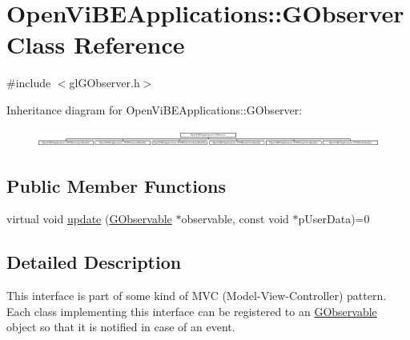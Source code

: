 \hypertarget{classOpenViBEApplications_1_1GObserver}{
\section{OpenViBEApplications::GObserver Class Reference}
\label{classOpenViBEApplications_1_1GObserver}
}


{\ttfamily \#include $<$glGObserver.h$>$}

Inheritance diagram for OpenViBEApplications::GObserver:\begin{figure}[H]
\begin{center}
\leavevmode
\includegraphics[height=0.587002cm]{classOpenViBEApplications_1_1GObserver}
\end{center}
\end{figure}
\subsection*{Public Member Functions}
\begin{DoxyCompactItemize}
\item 
virtual void \hyperlink{classOpenViBEApplications_1_1GObserver_a798ae875586bc6cf2c636272a97522f5}{update} (\hyperlink{classOpenViBEApplications_1_1GObservable}{GObservable} $\ast$observable, const void $\ast$pUserData)=0
\end{DoxyCompactItemize}


\subsection{Detailed Description}
This interface is part of some kind of MVC (Model-\/View-\/Controller) pattern. Each class implementing this interface can be registered to an \hyperlink{classOpenViBEApplications_1_1GObservable}{GObservable} object so that it is notified in case of an event. 

